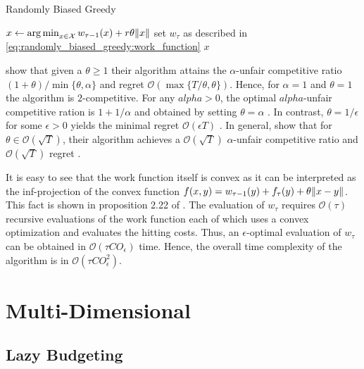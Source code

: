 \begin{algorithm}
    \caption{Randomly Biased Greedy \cite{Andrew2015}}\label{alg:ud:rbg}
    $x \gets \operatorname*{arg\,min}_{x \in \mathcal{X}} w_{\tau-1}(x) + r \theta \lVert x\rVert$\;
    set $w_{\tau}$ as described in \autoref{eq:randomly_biased_greedy:work_function}\;
    \Return $x$\;
\end{algorithm}

\citeauthor*{Andrew2015} show that given a $\theta \geq 1$ their algorithm attains the $\alpha$-unfair competitive ratio $(1+\theta) / \min \{\theta, \alpha\}$ and regret $\mathcal{O}(\max \{T / \theta, \theta\})$. Hence, for $\alpha = 1$ and $\theta = 1$ the algorithm is $2$-competitive. For any $alpha > 0$, the optimal $alpha$-unfair competitive ration is $1 + 1 / \alpha$ and obtained by setting $\theta = \alpha$ \cite{Andrew2015}. In contrast, $\theta = 1 / \epsilon$ for some $\epsilon > 0$ yields the minimal regret $\mathcal{O}(\epsilon T)$ \cite{Andrew2015}. In general, \citeauthor*{Andrew2015} show that for $\theta \in \mathcal{O}(\sqrt{T})$, their algorithm achieves a $\mathcal{O}(\sqrt{T})$ $\alpha$-unfair competitive ratio and $\mathcal{O}(\sqrt{T})$ regret \cite{Andrew2015}.

It is easy to see that the work function itself is convex as it can be interpreted as the inf-projection of the convex function $f(x,y) = w_{\tau-1}(y) + f_{\tau}(y) + \theta \lVert x - y\rVert$. This fact is shown in proposition 2.22 of \cite{Burke2015}. The evaluation of $w_{\tau}$ requires $\mathcal{O}(\tau)$ recursive evaluations of the work function each of which uses a convex optimization and evaluates the hitting costs. Thus, an $\epsilon$-optimal evaluation of $w_{\tau}$ can be obtained in $\mathcal{O}(\tau C O_{\epsilon})$ time. Hence, the overall time complexity of the algorithm is in $\mathcal{O}(\tau C O_{\epsilon}^2)$.

\section{Multi-Dimensional}\label{section:online_algorithms:md}

\subsection{Lazy Budgeting}\label{section:online_algorithms:md:lazy_budgeting}

